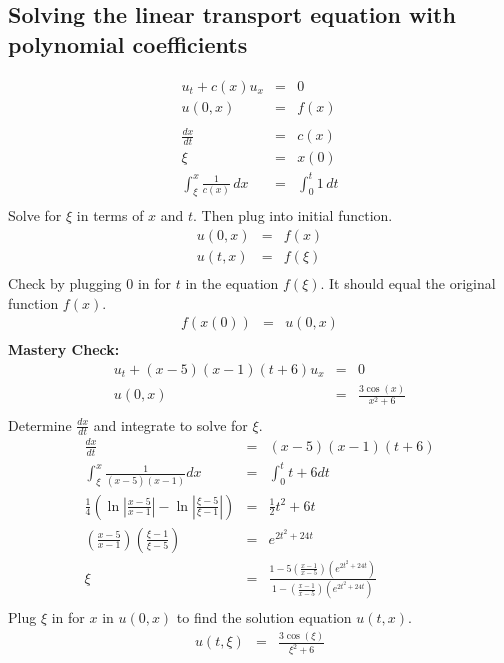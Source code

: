 \documentclass{article}
\def\d#1#2{\frac{d#1}{d#2}} %
\newcommand{\bea}{\begin{eqnarray*}}
\newcommand{\eea}{\end{eqnarray*}}
\begin{document}
\subsection{Solving the linear transport equation with polynomial coefficients}
\bea
u_t + c(x)u_x &=& 0\\
u(0,x) &=& f(x)\\\\
\d{x}{t} &=& c(x)\\
\xi &=& x(0)\\
\int_{\xi}^{x}{\frac{1}{c(x)}\,dx} &=& \int_{0}^{t}{1\,dt}\\
\eea
Solve for $\xi$ in terms of $x$ and $t$. Then plug into initial function.
\bea
u(0,x) &=& f(x)\\
u(t,x) &=& f(\xi)\\
\eea
Check by plugging $0$ in for $t$ in the equation $f(\xi)$. It should equal the original function $f(x)$.
\bea
f(x(0)) &=& u(0,x)\\
\eea
\textbf{Mastery Check:}\\
\bea
u_t + (x-5)(x-1)(t+6)u_x &=& 0\\
u(0,x) &=& \frac{3\cos(x)}{x^2+6}\\
\eea
Determine $\d{x}{t}$ and integrate to solve for $\xi$.
\bea
\d{x}{t} &=& (x-5)(x-1)(t+6)\\
\int_{\xi}^{x}{\frac{1}{(x-5)(x-1)}}{dx} &=& \int_{0}^{t}{t+6}{dt}\\
\frac{1}{4} \left(\ln\left|\frac{x-5}{x-1}\right| - \ln\left|\frac{\xi-5}{\xi-1}\right|\right) &=& \frac{1}{2}t^2+6t\\
\left(\frac{x-5}{x-1}\right)\left(\frac{\xi-1}{\xi-5}\right) &=& e^{2t^2+24t}\\
\xi &=& \frac{1-5\left(\frac{x-1}{x-5}\right)\left(e^{2t^2+24t}\right)}{1-\left(\frac{x-1}{x-5}\right)\left(e^{2t^2+24t}\right)}\\
\eea
Plug $\xi$ in for $x$ in $u(0,x)$ to find the solution equation $u(t,x)$.
\bea
u(t,\xi) &=& \frac{3\cos(\xi)}{\xi^2+6}\\
\eea
\begin{center}
\end{center}
\end{document}
